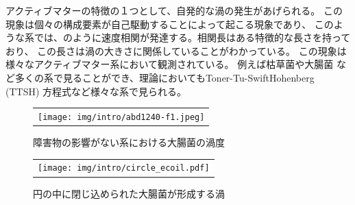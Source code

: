 \documentclass[/Users/ikedahajime/GitHub/reserch/master_report/thesis]{subfiles}
\begin{document}
アクティブマターの特徴の１つとして、自発的な渦の発生があげられる。
この現象は個々の構成要素が自己駆動することによって起こる現象であり、
このような系では、のように速度相関が発達する。相関長はある特徴的な長さを持っており、
この長さは渦の大きさに関係していることがわかっている。
この現象は様々なアクティブマター系において観測されている。
例えば枯草菌\cite{wensinkMesoscaleTurbulenceLiving2012}や大腸菌\cite{pengImagingEmergenceBacterial2021}
など多くの系で見ることができ、理論においてもToner-Tu-SwiftHohenberg (TTSH) 方程式など\cite{wensinkMesoscaleTurbulenceLiving2012}様々な系で見られる。%
\begin{figure}%
    \centering
    \begin{tabular}{c}
        \begin{minipage}{0.6\hsize}
            \texttt{[image: img/intro/abd1240-f1.jpeg]}
        \end{minipage}

    \end{tabular}
    \caption[Four sample images]
    {
        障害物の影響がない系における大腸菌の渦度\cite{pengImagingEmergenceBacterial2021}
    }
    \label{fig:intro_flow}
\end{figure}
\begin{figure}
    \centering
    \begin{tabular}{c}
        \begin{minipage}{0.6\hsize}
            \texttt{[image: img/intro/circle\_ecoil.pdf]}
        \end{minipage}
    \end{tabular}
    \caption[Four sample images]
    {
        円の中に閉じ込められた大腸菌が形成する渦\cite{beppuGeometrydrivenCollectiveOrdering2017}
    }
    \label{fig:intro_confine}
\end{figure}
\end{document}
